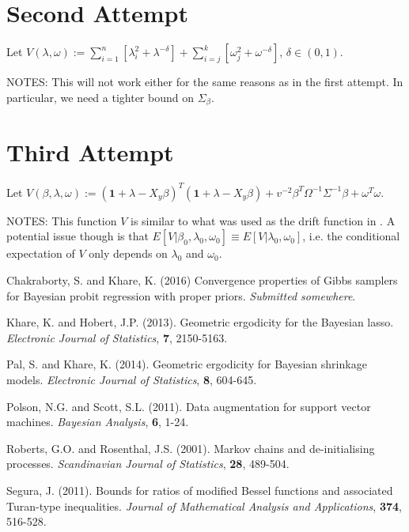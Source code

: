 \documentclass[12pt]{article}
\begin{document}
\newpage

\section{Second Attempt}

Let $V(\lambda, \omega) := \sum_{i=1}^{n}[\lambda_i^2 + \lambda^{-\delta}] + \sum_{i=j}^{k}[\omega_j^2 + \omega^{-\delta}]$, $\delta \in (0,1)$.

NOTES: This will not work either for the same reasons as in the first attempt. In particular, we need a tighter bound on $\Sigma_{\beta}$.

\section{Third Attempt}

Let $V(\beta, \lambda, \omega) := (\bm{1} + \lambda - X_{y}\beta)^T (\bm{1} + \lambda - X_{y}\beta) + v^{-2} \beta^T \Omega^{-1}\Sigma^{-1}\beta +
\omega^T \omega$.

NOTES: This function $V$ is similar to what was used as the drift function in \cite{lasso}. A potential issue though is that $E[V|\beta_0,
\lambda_0, \omega_0] \equiv E[V| \lambda_0, \omega_0]$, i.e. the conditional expectation of $V$ only depends on $\lambda_0$ and $\omega_0$.

\newpage

\begin{thebibliography}{9}
    Chakraborty, S. and Khare, K. (2016) Convergence properties of Gibbs samplers for Bayesian probit regression with proper priors.
    \emph{Submitted somewhere}.

    Khare, K. and Hobert, J.P. (2013). Geometric ergodicity for the Bayesian lasso. \emph{Electronic Journal of Statistics}, \textbf{7}, 2150-5163.

    Pal, S. and Khare, K. (2014). Geometric ergodicity for Bayesian shrinkage models. \emph{Electronic Journal of Statistics}, \textbf{8}, 604-645.

    Polson, N.G. and Scott, S.L. (2011). Data augmentation for support vector machines. \emph{Bayesian Analysis}, \textbf{6}, 1-24.

    Roberts, G.O. and Rosenthal, J.S. (2001). Markov chains and de-initialising processes. \emph{Scandinavian Journal of Statistics}, \textbf{28},
    489-504.

    Segura, J. (2011). Bounds for ratios of modified Bessel functions and associated Turan-type inequalities. \emph{Journal of Mathematical Analysis
    and Applications}, \textbf{374}, 516-528.
\end{thebibliography}
\end{document}
